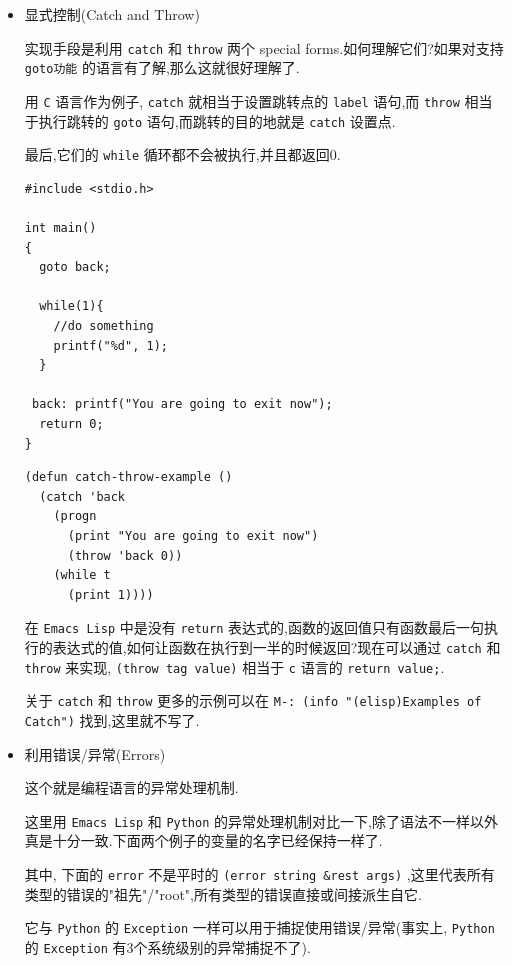 \documentclass[11pt]{article}
\begin{document}
\begin{itemize}
\item 显式控制(Catch and Throw)

实现手段是利用 \texttt{catch} 和 \texttt{throw} 两个 special forms.如何理解它们?如果对支持 \texttt{goto功能} 的语言有了解,那么这就很好理解了.

用 \texttt{C} 语言作为例子, \texttt{catch} 就相当于设置跳转点的 \texttt{label} 语句,而 \texttt{throw} 相当于执行跳转的 \texttt{goto} 语句,而跳转的目的地就是 \texttt{catch} 设置点.

最后,它们的 \texttt{while} 循环都不会被执行,并且都返回0.

\begin{verbatim}
#include <stdio.h>

int main()
{
  goto back;

  while(1){
    //do something
    printf("%d", 1);
  }

 back: printf("You are going to exit now");
  return 0;
}
\end{verbatim}

\begin{verbatim}
(defun catch-throw-example ()
  (catch 'back
    (progn
      (print "You are going to exit now")
      (throw 'back 0))
    (while t
      (print 1))))
\end{verbatim}

在 \texttt{Emacs Lisp} 中是没有 \texttt{return} 表达式的,函数的返回值只有函数最后一句执行的表达式的值,如何让函数在执行到一半的时候返回?现在可以通过 \texttt{catch} 和 \texttt{throw} 来实现, \texttt{(throw tag value)} 相当于 \texttt{c} 语言的 \texttt{return value;}.

关于 \texttt{catch} 和 \texttt{throw} 更多的示例可以在 \texttt{M-: (info "(elisp)Examples of Catch")} 找到,这里就不写了.

\item 利用错误/异常(Errors)

这个就是编程语言的异常处理机制.

这里用 \texttt{Emacs Lisp} 和 \texttt{Python} 的异常处理机制对比一下,除了语法不一样以外真是十分一致.下面两个例子的变量的名字已经保持一样了.

其中, 下面的 \texttt{error} 不是平时的 \texttt{(error string \&rest args)} ,这里代表所有类型的错误的"祖先"/"root",所有类型的错误直接或间接派生自它.

它与 \texttt{Python} 的 \texttt{Exception} 一样可以用于捕捉使用错误/异常(事实上, \texttt{Python} 的 \texttt{Exception} 有3个系统级别的异常捕捉不了).


\end{itemize}
\end{document}
